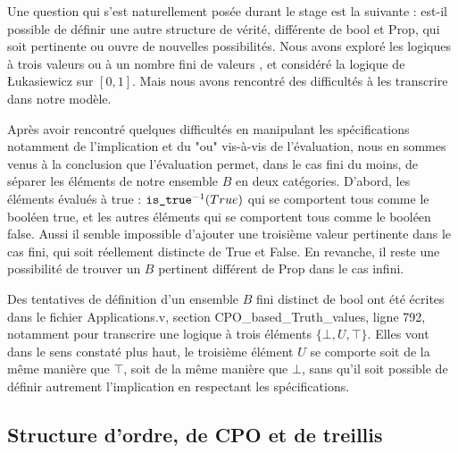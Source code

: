 \documentclass{article}
\newcommand\code[1]{{\fontfamily{lmtt}\selectfont #1}}
\theoremstyle{definition}
\begin{document}
\bigskip

Une question qui s'est naturellement posée durant le stage est la suivante : est-il possible de définir une autre structure de vérité, différente de \code{bool} et \code{Prop}, qui soit pertinente ou ouvre de nouvelles possibilités. Nous avons exploré les logiques à trois valeurs ou à un nombre fini de valeurs \cite{manylogic}, et considéré la logique de Łukasiewicz sur $[0,1]$. Mais nous avons rencontré des difficultés à les transcrire dans notre modèle.

Après avoir rencontré quelques difficultés en manipulant les spécifications notamment de l'implication et du "ou" vis-à-vis de l'évaluation, nous en sommes venus à la conclusion que l'évaluation permet, dans le cas fini du moins, de séparer les éléments de notre ensemble $B$ en deux catégories. D'abord, les éléments évalués à true : $\text{\code{is\_true}}^{-1}(True)$ qui se comportent tous comme le booléen \code{true}, et les autres éléments qui se comportent tous comme le booléen \code{false}. Aussi il semble impossible d'ajouter une troisième valeur pertinente dans le cas fini, qui soit réellement distincte de True et False. En revanche, il reste une possibilité de trouver un $B$ pertinent différent de Prop dans le cas infini.

Des tentatives de définition d'un ensemble $B$ fini distinct de \code{bool} ont été écrites dans le fichier \code{Applications.v}, section \code{CPO\_based\_Truth\_values}, ligne 792, notamment pour transcrire une logique à trois éléments $\{\bot, U, \top\}$. Elles vont dans le sens constaté plus haut, le troisième élément $U$ se comporte soit de la même manière que $\top$, soit de la même manière que $\bot$, sans qu'il soit possible de définir autrement l'implication en respectant les spécifications.


\subsection{Structure d'ordre, de CPO et de treillis}
\end{document}
